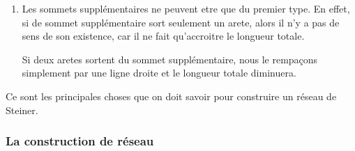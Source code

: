 \documentclass[10pt,a4paper]{article}%
\theoremstyle{theorem}
\theoremstyle{definition}
\begin{document}
\begin{enumerate}
				\begin{center}
				\end{center}
			
				\item Les sommets supplémentaires ne peuvent etre que du premier type. En effet, si de sommet supplémentaire sort seulement un arete, alors il n'y a pas de sens de son existence, car il ne fait qu'accroitre le longueur totale. 
				
				Si deux aretes sortent du sommet supplémentaire, nous le rempaçons simplement par une ligne droite et le longueur totale diminuera.
			\end{enumerate}
	        
	        Ce sont les principales choses que on doit savoir pour construire un réseau de Steiner.
	        
	        \subsubsection{La construction de réseau}
	        
\end{document}

